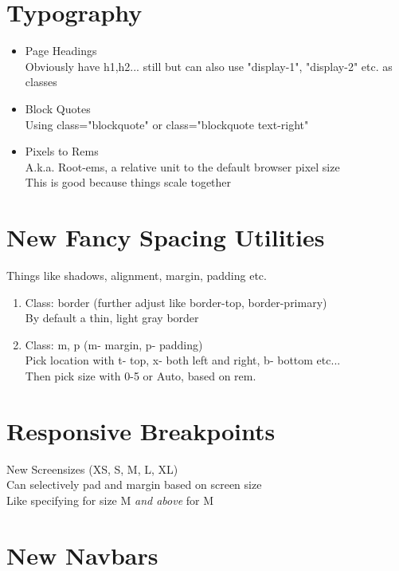 \documentclass{article}
\begin{document}
\section{Typography}

	\begin{itemize}
		\item Page Headings
		\\Obviously have h1,h2... still but can also use "display-1", "display-2" etc. as classes
		\item Block Quotes
		\\Using class="blockquote" or class="blockquote text-right"
		\item Pixels to Rems
		\\A.k.a. Root-ems, a relative unit to the default browser pixel size
		\\This is good because things scale together
	\end{itemize}

\section{New Fancy Spacing Utilities}

	Things like shadows, alignment, margin, padding etc.
	
	\begin{enumerate}
	\item Class: border (further adjust like border-top, border-primary)
	\\By default a thin, light gray border
	\item Class: m, p (m- margin, p- padding)
	\\Pick location with t- top, x- both left and right, b- bottom etc...
	\\Then pick size with 0-5 or Auto, based on rem.
	\end{enumerate}	

\section{Responsive Breakpoints}

	New Screensizes (XS, S, M, L, XL)
	\\Can selectively pad and margin based on screen size
	\\Like specifying for size M \emph{and above} for M

\section{New Navbars}
	
\end{document}

